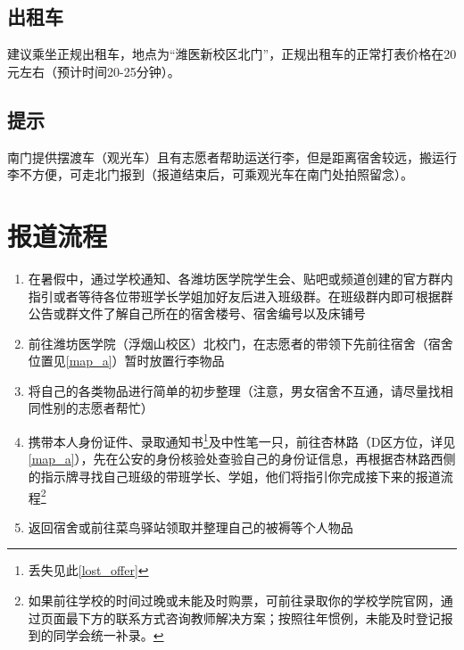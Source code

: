 \subsection[出租车]{出租车}
建议乘坐正规出租车，地点为“潍医新校区北门”，正规出租车的正常打表价格在20元左右（预计时间20-25分钟）。

\subsection[提示]{提示}
南门提供摆渡车（观光车）且有志愿者帮助运送行李，但是距离宿舍较远，搬运行李不方便，可走北门报到（报道结束后，可乘观光车在南门处拍照留念）。

\section[报道流程]{报道流程}
\begin{enumerate}
    \item 在暑假中，通过学校通知、各潍坊医学院学生会、贴吧或频道创建的官方群内指引或者等待各位带班学长学姐加好友后进入班级群。在班级群内即可根据群公告或群文件了解自己所在的宿舍楼号、宿舍编号以及床铺号
    \item 前往潍坊医学院（浮烟山校区）北校门，在志愿者的带领下先前往宿舍（宿舍位置见\ref{map_a}）暂时放置行李物品
    \item 将自己的各类物品进行简单的初步整理（注意，男女宿舍不互通，请尽量找相同性别的志愿者帮忙）
    \item 携带本人身份证件、录取通知书\footnote{丢失见此\ref{lost_offer}}及中性笔一只，前往杏林路（D区方位，详见\ref{map_a}），先在公安的身份核验处查验自己的身份证信息，再根据杏林路西侧的指示牌寻找自己班级的带班学长、学姐，他们将指引你完成接下来的报道流程\footnote{如果前往学校的时间过晚或未能及时购票，可前往录取你的学校学院官网，通过页面最下方的联系方式咨询教师解决方案；按照往年惯例，未能及时登记报到的同学会统一补录。}
    \item 返回宿舍或前往菜鸟驿站领取并整理自己的被褥等个人物品
\end{enumerate}